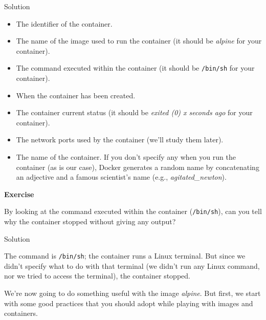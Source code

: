 \documentclass[
]{article}
\newenvironment{infobox}[1]
  {
  \begin{itemize}
  \renewcommand{\labelitemi}{
    \raisebox{-.7\height}[0pt][0pt]{
      
    }
  }
  \setlength{\fboxsep}{1em}
  \begin{whitebox}
  \item
  }
  {
  \end{whitebox}
  \end{itemize}
  }
\theoremstyle{definition}
\theoremstyle{definition}
\theoremstyle{definition}
\theoremstyle{remark}
\let\BeginKnitrBlock\begin \let\EndKnitrBlock\end
\begin{document}
Solution

\begin{infobox}{exercisebox}

\begin{itemize}
\item
  The identifier of the container.
\item
  The name of the image used to run the container (it should be \emph{alpine} for your
  container).
\item
  The command executed within the container (it should be \texttt{/bin/sh} for your container).
\item
  When the container has been created.
\item
  The container current status (it should be \emph{exited (0) x seconds ago} for your container).
\item
  The network ports used by the container (we'll study them later).
\item
  The name of the container. If you don't specify any when you
  run the container (as is our case),
  Docker generates a random name by concatenating an adjective and
  a famous scientist's name (e.g., \emph{agitated\_newton}).
\end{itemize}

\end{infobox}

\begin{infobox}{exercisebox}

\textbf{Exercise}

\BeginKnitrBlock{exercise}
\protect\hypertarget{exr:unnamed-chunk-6}{}{\label{exr:unnamed-chunk-6} }By looking at the command executed within the container (\texttt{/bin/sh}),
can you tell why the container stopped without giving any output?
\EndKnitrBlock{exercise}

\end{infobox}

Solution

\begin{infobox}{exercisebox}

The command is \texttt{/bin/sh};
the container runs a Linux terminal.
But since we didn't specify what to do with that terminal
(we didn't run any Linux command, nor we tried to access the terminal),
the container stopped.

\end{infobox}

We're now going to do something useful with the image \emph{alpine}.
But first, we start with some good practices that you should
adopt while playing with images and containers.
\end{document}
